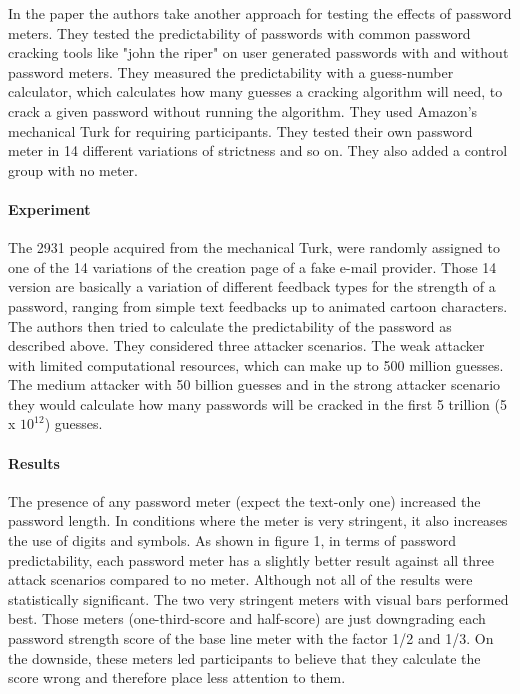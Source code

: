 \documentclass[12pt,a4paper]{article}
\begin{document}
In the paper  \cite{measureUp} the authors take another approach for testing the effects of password meters. They tested the predictability of passwords with common password cracking tools like "john the riper" on user generated passwords with and without password meters. They measured the predictability with a guess-number calculator, which calculates how many guesses a cracking algorithm will need, to crack a given password without running the algorithm.
They used Amazon's mechanical Turk for requiring participants. They tested their own password meter in 14 different variations of strictness and so on. They also added a control group with no meter.

\paragraph{Experiment}
The 2931 people acquired from the mechanical Turk, were randomly assigned to one of the 14 variations of the creation page of a fake e-mail provider.
Those 14 version are basically a variation of different feedback types for the strength of a password, ranging from simple text feedbacks up to animated cartoon characters. The authors then tried to calculate the predictability of the password as described above. They considered three attacker scenarios. The weak attacker with limited computational resources, which can make up to 500 million guesses. The medium attacker with 50 billion guesses and in the strong attacker scenario they would calculate how many passwords will be cracked in the first 5 trillion (5 x $10^{12}$) guesses.


\paragraph{Results}
The presence of any password meter (expect the text-only one) increased the password length. In conditions where the meter is very stringent, it also increases the use of digits and symbols. 
As shown in figure 1, in terms of password predictability, each password meter has a slightly better result against all three attack scenarios compared to no meter. Although not all of the results were statistically significant. The two very stringent meters with visual bars performed best. Those meters (one-third-score and half-score) are just downgrading each password strength score of the base line meter with the factor 1/2 and 1/3. On the downside, these meters led participants to believe that they calculate the score wrong and therefore place less attention to them.
\end{document}
